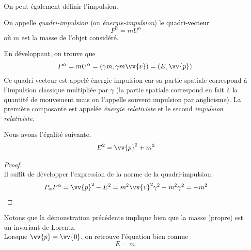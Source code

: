 \documentclass[a4paper,11pt]{report}
\begin{document}
            On peut également définir l'impulsion.
            \begin{defn}
                On appelle \textit{quadri-impulsion} (ou \textit{énergie-impulsion}) le quadri-vecteur 
                \begin{equation}
                    P^\alpha = mU^\alpha
                \end{equation}
                où $m$ est la masse de l'objet considéré.
            \end{defn}
            En développant, on trouve que
            \begin{equation}
                P^\alpha = m U^\alpha = (\gamma m,\gamma m\vv{v}) = (E,\vv{p}).
            \end{equation}
            Ce quadri-vecteur est appelé énergie impulsion car sa partie spatiale correspond à l'impulsion classique multipliée par $\gamma$ (la partie spatiale correspond en fait à la quantité de mouvement mais on l'appelle souvent impulsion par anglicisme). La première composante est appelée \textit{énergie relativiste} et le second \textit{impulsion relativiste}.
            
            \begin{prop}\begin{leftbar}
                Nous avons l'égalité suivante.
                \begin{equation}
                    E^2 = \vv{p}^2 + m^2
                \end{equation}
            \end{leftbar}\end{prop}
            \begin{proof}
            ${}$\\
                Il suffit de développer l'expression de la norme de la quadri-impulsion.
                \begin{equation}
                P_\alpha P^\alpha = \vv{p}^2-E^2 = m^2\vv{v}^2\gamma^2-m^2\gamma^2 = -m^2
            \end{equation}
            \end{proof}
            
            Notons que la démonstration précédente implique bien que la masse (propre) est un invariant de Lorentz.\\
            
            Lorsque $\vv{p} = \vv{0}$, on retrouve l'équation bien connue
            \begin{equation}
                E = m.
            \end{equation}
            
\end{document}
